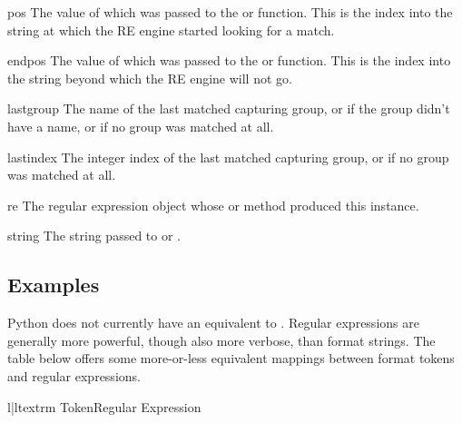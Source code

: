 \begin{memberdesc}[MatchObject]{pos}
The value of  which was passed to the
 or  function.  This is the index
into the string at which the RE engine started looking for a match.
\end{memberdesc}

\begin{memberdesc}[MatchObject]{endpos}
The value of  which was passed to the
 or  function.  This is the index
into the string beyond which the RE engine will not go.
\end{memberdesc}

\begin{memberdesc}[MatchObject]{lastgroup}
The name of the last matched capturing group, or  if the
group didn't have a name, or if no group was matched at all.
\end{memberdesc}

\begin{memberdesc}[MatchObject]{lastindex}
The integer index of the last matched capturing group, or 
if no group was matched at all.
\end{memberdesc}

\begin{memberdesc}[MatchObject]{re}
The regular expression object whose  or
 method produced this  instance.
\end{memberdesc}

\begin{memberdesc}[MatchObject]{string}
The string passed to  or .
\end{memberdesc}

\subsection{Examples}


Python does not currently have an equivalent to .
Regular expressions are generally more powerful, though also more
verbose, than  format strings.  The table below
offers some more-or-less equivalent mappings between
 format tokens and regular expressions.

\begin{tableii}{l|l}{textrm}{ Token}{Regular Expression}
         {}
         {}
         {}
         {}
         {}
         {}
         {}
         {}
         {}
\end{tableii}

